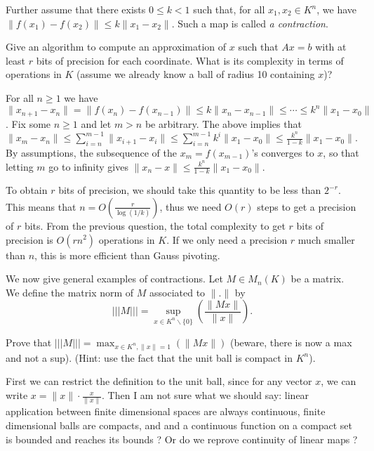 \documentclass[11pt]{exam}
\theoremstyle{definition}
\begin{document}
{\begin{questions}
        Further assume that there exists $0\leq k<1$ such that, for all $x_1,x_2 \in K^n$, we have $\|f(x_1)-f(x_2)\|\leq k\| x_1-x_2\|$. Such a map is called {\em a contraction}. 
        
        \question  Give an algorithm to compute an approximation of $x$ such that $Ax = b$ with at least $r$ bits of precision for each coordinate. What is its complexity in terms of operations in $K$ (assume we already know a ball of radius 10 containing $x$)?

        \begin{solution}
          For all $n \geq 1$ we have $\|x_{n+1}-x_n\| = \|f(x_n)-f(x_{n-1})\| \leq k \|x_n-x_{n-1}\| \leq \cdots \leq k^n \|x_1-x_0\|$. Fix some $n\geq 1$ and let $m>n$ be arbitrary. The above implies that $\|x_m-x_n\| \leq \sum_{i = n}^{m-1} \|x_{i+1}-x_i\| \leq \sum_{i = n}^{m-1} k^i \|x_1-x_0\| \leq \frac{k^n}{1-k}\|x_1-x_0\|$. By assumptions, the subsequence of the $x_m=f(x_{m-1})$'s converges to $x$, so that letting $m$ go to infinity gives $\|x_n-x\|\leq \frac{k^n}{1-k}\|x_1-x_0\|$.

          To obtain $r$ bits of precision, we should take this quantity to be less than $2^{-r}$. This means that $n = O(\frac{r}{\log(1/k)})$, thus we need $O(r)$ steps to get a precision of $r$ bits. From the previous question, the total complexity to get $r$ bits of precision is $O(rn^2)$ operations in $K$. If we only need a precision $r$ much smaller than $n$, this is more efficient than Gauss pivoting.
        \end{solution}

        	We now give general examples of contractions. Let $M \in M_n(K)$ be a matrix. We define the matrix norm of $M$ associated to $\|.\|$ by $$|||M||| = \sup_{x \in K^n\backslash \{0\}}\left(\frac{\|Mx\|}{\|x\|}\right).$$
	
	\question Prove that $|||M||| = \max_{x \in K^n, \|x\| = 1}\left(\|Mx\|\right)$ (beware, there is now a max and not a sup). (Hint: use the fact that the unit ball is compact in $K^n$).

        \begin{solution}
          First we can restrict the definition to the unit ball, since for any vector $x$, we can write $x=\|x\| \cdot \frac{x}{\| x\|}$. Then I am not sure what we should say: linear application between finite dimensional spaces are always continuous, finite dimensional balls are compacts, and and a continuous function on a compact set is bounded and reaches its bounds ? Or do we reprove continuity of linear maps ?
        \end{solution}
        

\end{questions}}
\end{document}
